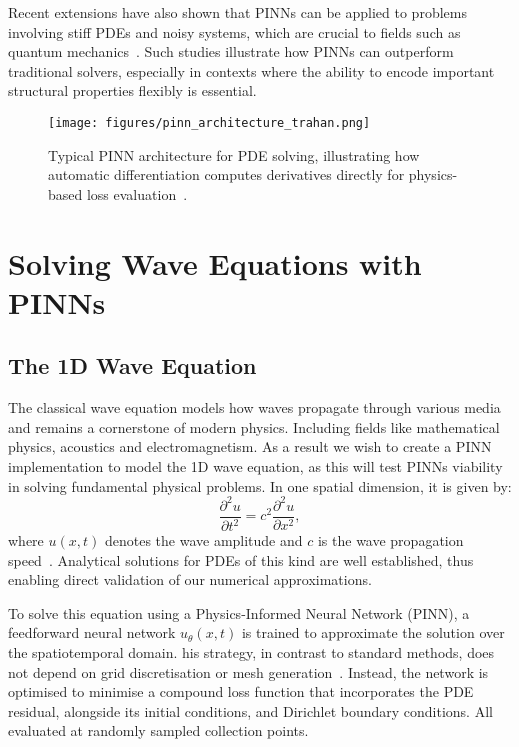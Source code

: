 \documentclass[12pt,a4paper]{article}
\begin{document}
Recent extensions have also shown that PINNs can be applied to problems involving stiff PDEs and noisy systems, which are crucial to fields such as quantum mechanics~\cite{trahan2024quantum}. Such studies illustrate how PINNs can outperform traditional solvers, especially in contexts where the ability to encode important structural properties flexibly is essential.

\begin{figure}[h!]
  \centering
  \texttt{[image: figures/pinn\_architecture\_trahan.png]}
  \caption{Typical PINN architecture for PDE solving, illustrating how automatic differentiation computes derivatives directly for physics-based loss evaluation~\cite{trahan2024quantum}.}
  \label{fig:pinn_architecture}
\end{figure}


\section{Solving Wave Equations with PINNs}

\subsection{The 1D Wave Equation}

The classical wave equation models how waves propagate through various media and remains a cornerstone of modern physics. Including fields like mathematical physics, acoustics and electromagnetism. As a result we wish to create a PINN implementation to model the 1D wave equation, as this will test PINNs viability in solving fundamental physical problems. In one spatial dimension, it is given by:
\begin{equation}
\frac{\partial^2 u}{\partial t^2} = c^2 \frac{\partial^2 u}{\partial x^2},
\label{eq:wave-1d}
\end{equation}
where \( u(x,t) \) denotes the wave amplitude and \( c \) is the wave propagation speed~\cite{strauss2007partial, taylor2010partial}. Analytical solutions for PDEs of this kind are well established, thus enabling direct validation of our numerical approximations.

To solve this equation using a Physics-Informed Neural Network (PINN), a feedforward neural network \( u_\theta(x,t) \) is trained to approximate the solution over the spatiotemporal domain. his strategy, in contrast to standard methods, does not depend on grid discretisation or mesh generation~\cite{raissi2019physics}. Instead, the network is optimised to minimise a compound loss function that incorporates the PDE residual, alongside its initial conditions, and Dirichlet boundary conditions. All evaluated at randomly sampled collection points.
\end{document}
